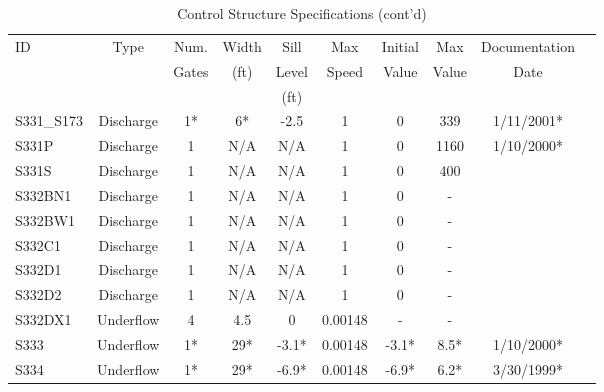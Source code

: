 \scriptsize
\begin{table}[h]
\caption{Control Structure Specifications (cont'd)}
\label{tab:struc-specs3}
\begin{tabular}{@{}lccccccccc@{}}
\toprule
{ID}            & {Type}        & Num.     & Width       & Sill         & Max         & Initial         & Max     & Documentation  \\
                &               & Gates    & (ft)        & Level        & Speed       & Value           & Value   & Date           \\
                &               &          &             & (ft)         &             &                 &         &                \\
\hline
{S331\_S173}    & Discharge     & 1*       & 6*          & -2.5         & 1           & 0               & 339     & 1/11/2001*  \\
{S331P}         & Discharge     & 1        & N/A         & N/A          & 1           & 0               & 1160    & 1/10/2000*  \\
{S331S}         & Discharge     & 1        & N/A         & N/A          & 1           & 0               & 400     &             \\
{S332BN1}       & Discharge     & 1        & N/A         & N/A          & 1           & 0               & -       &             \\
{S332BW1}       & Discharge     & 1        & N/A         & N/A          & 1           & 0               & -       &             \\
{S332C1}        & Discharge     & 1        & N/A         & N/A          & 1           & 0               & -       &             \\
{S332D1}        & Discharge     & 1        & N/A         & N/A          & 1           & 0               & -       &             \\
{S332D2}        & Discharge     & 1        & N/A         & N/A          & 1           & 0               & -       &             \\
{S332DX1}       & Underflow     & 4        & 4.5         & 0            & 0.00148     & -               & -       &             \\
{S333}          & Underflow     & 1*       & 29*         & -3.1*        & 0.00148     & -3.1*           & 8.5*    & 1/10/2000*  \\
{S334}          & Underflow     & 1*       & 29*         & -6.9*        & 0.00148     & -6.9*           & 6.2*    & 3/30/1999*  \\

\end{tabular}
\end{table}
